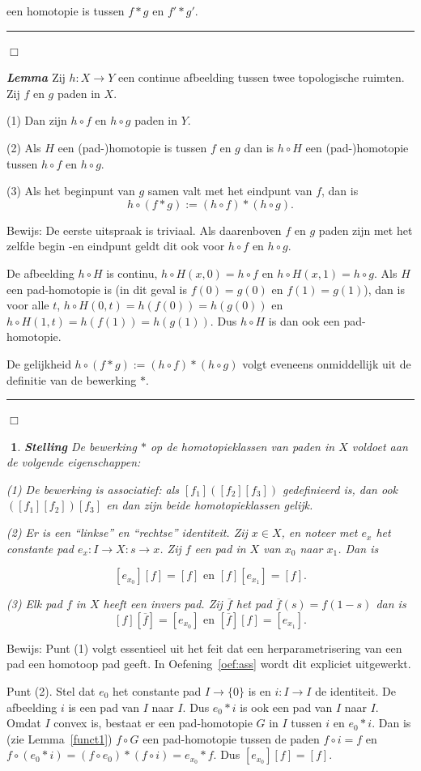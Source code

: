 \documentclass[12pt]{book}
\newcommand{\bew}{{\sc Bewijs: }}
\newcommand{\B}{\rule{1mm}{0mm} \hfill $\Box$ }
\newtheorem{stelh}{$\!\!$}[section]
\newenvironment{stel}{\begin{stelh}{\em {\bf Stelling }}}{\end{stelh}}
\newenvironment{lem}{\begin{lemh}{\em {\bf Lemma }}}{\end{lemh}}
\begin{document}
een homotopie is tussen $f*g$ en $f'* g'$. 
\B

\begin{lem} \label{funct1} Zij $h:X\to Y$ een continue afbeelding tussen twee topologische ruimten. Zij $f$ en $g$ paden in $X$. 

(1) Dan zijn  $h\circ f$  en $h\circ g$ paden in $Y$. 

(2) Als $H$ een (pad-)homotopie is tussen $f$ en $g$ dan is $h\circ H$ een (pad-)homotopie tussen $h\circ f$  en $h\circ g$.

(3) Als het beginpunt van $g$ samen valt met het eindpunt van $f$, dan is 
$$h\circ(f*g):=(h\circ f)*(h\circ g).$$
\end{lem}
\bew De eerste uitspraak is triviaal. Als daarenboven $f$ en $g$ paden zijn met het zelfde begin -en eindpunt geldt dit ook voor $h\circ f$  en $h\circ g$. 

De afbeelding $h\circ H$ is continu, $h\circ H(x, 0)=h\circ f$ en $h\circ H(x,1)=h\circ g$. Als $H$ een pad-homotopie is (in dit geval is $f(0)=g(0)$ en $f(1)=g(1)$), dan is voor alle $t$,  $h\circ H(0,t)= h(f(0))=h(g(0))$ en 
$h\circ H(1,t)= h(f(1))=h(g(1))$. Dus $h\circ H$ is dan ook een pad-homotopie.

De gelijkheid $h\circ(f*g):=(h\circ f)*(h\circ g)$ volgt eveneens onmiddellijk uit de definitie van de bewerking $*$.
\B
\begin{stel}\label{stel:grp} De bewerking $*$ op de homotopieklassen van paden in $X$ voldoet aan de volgende eigenschappen:

{\rm (1)} De bewerking is associatief: als $[f_1]([f_2][f_3])$ gedefinieerd is, dan ook $([f_1][f_2])[f_3]$ en dan zijn beide
homotopieklassen gelijk.

{\rm (2)} Er is een ``linkse'' en ``rechtse'' identiteit. Zij $x\in X$, en noteer met $e_x$ het constante pad $e_x:I\to X: s\to x$. Zij $f$ een pad in $X$ van $x_0$ naar $x_1$. Dan is

$$[e_{x_{0}}][f]=[f]  \mbox{ en } [f][e_{x_{1}}]=[f].$$

{\rm (3)} Elk pad $f$ in $X$ heeft een invers pad. Zij $\overline{f}$ het pad $\overline{f}(s)= f(1-s)$ dan is
$$[f][\overline{f}]=[e_{x_{0}}] \mbox{ en } [\overline{f}][f]=[e_{x_{1}}].$$
\end{stel}
\bew Punt (1) volgt essentieel uit het feit dat een herparametrisering van een pad een homotoop pad geeft. In Oefening~\ref{oef:ass} wordt dit expliciet uitgewerkt.


Punt (2).
Stel dat $e_0$ het constante pad $I\to \{0\}$ is en $i:I\to I$ de identiteit. De afbeelding $i$ is een pad van $I$ naar $I$. 
Dus $e_0*i$ is ook een pad van $I$ naar $I$. Omdat $I$ convex is, bestaat er een pad-homotopie $G$ in $I$ tussen $i$ en $e_0 * i$. Dan is (zie Lemma~\ref{funct1}) $f\circ G$ een pad-homotopie tussen de paden $f\circ i=f$ en $f\circ (e_0*i)=(f\circ e_0)*(f\circ i)=e_{x_{0}}* f.$ Dus $[e_{x_{0}}][f]=[f]$.
\end{document}
